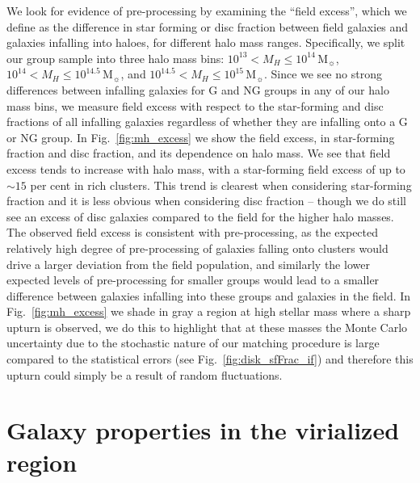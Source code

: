 \documentclass[a4paper,fleqn,usenatbib]{mnras}
\newcommand{\Msun}{\,\mathrm{M_{\sun}}}
\begin{document}
We look for evidence of pre-processing by examining the ``field
excess'', which we define as the difference in star forming or disc
fraction between field galaxies and galaxies infalling into haloes,
for different halo mass ranges.  Specifically, we split our group
sample into three halo mass bins: $10^{13} < M_H \le 10^{14}\Msun$,
  $10^{14} < M_H \le 10^{14.5}\Msun$, and $10^{14.5} < M_H \le
  10^{15}\Msun$.  Since we see no strong
differences between infalling galaxies for G and NG groups in any of
our halo mass bins, we measure field excess with
respect to the star-forming and
disc fractions of all infalling galaxies regardless of whether they
are infalling onto a G or NG group.  In Fig.~\ref{fig:mh_excess}  we show
the field excess, in star-forming fraction and disc
fraction, and its dependence on halo mass.  We see that field excess
tends to increase with halo mass, with a star-forming field excess of
up to $\sim\!15$ per cent in rich clusters.  This trend is clearest when
considering star-forming fraction and it is less obvious when
considering disc fraction -- though we do still 
see an excess of disc galaxies compared to the field for the higher
halo masses.  The observed field excess is consistent with pre-processing, as
the expected relatively high degree of pre-processing of galaxies falling onto
clusters would drive a larger deviation from the field population, and
similarly the lower expected levels of pre-processing for smaller
groups would lead to a smaller difference between galaxies infalling into
these groups and galaxies in the field.  In Fig.~\ref{fig:mh_excess}
we shade in gray a region at high stellar mass where a sharp upturn is
observed, we do this to highlight that at these masses the Monte Carlo
uncertainty due to the stochastic nature of our matching procedure is
large compared to the statistical errors (see
Fig.~\ref{fig:disk_sfFrac_if}) and therefore this upturn could simply
be a result of random fluctuations.


\section{Galaxy properties in the virialized region}
\label{sec:virial}
\end{document}
